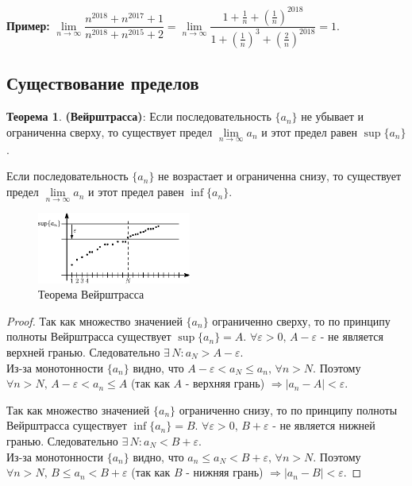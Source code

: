 \documentclass[12pt]{article}
\theoremstyle{definition}
\newtheorem{theorem}{Теорема}
\begin{document}
\textbf{Пример:} $\lim\limits_{n \to \infty}\dfrac{n^{2018} + n^{2017} + 1}{n^{2018} + n^{2015} + 2} = \lim\limits_{n \to \infty}\dfrac{1 + \frac{1}{n} + (\frac{1}{n})^{2018}}{1 + (\frac{1}{n})^3 + (\frac{2}{n})^{2018}} = 1$.


\subsection*{Существование пределов}

\begin{theorem}\textbf{(Вейрштрасса)}:
	Если последовательность $\{a_n\}$ не убывает и ограниченна сверху, то существует предел  $\lim\limits_{n \rightarrow \infty}{a_n}$ и этот предел равен $\sup\{a_n\}$.
	
	Если последовательность $\{a_n\}$ не возрастает и ограниченна снизу, то существует предел  $\lim\limits_{n \rightarrow \infty}{a_n}$ и этот предел равен $\inf \{a_n\}$.
\end{theorem}


\begin{figure}[H]
	\centering
	\includegraphics[width=0.45\textwidth]{8_10.eps}
	\caption{Теорема Вейрштрасса}
	\label{fig:8_12}
\end{figure}

\begin{proof}
Так как множество значенией $\{a_n\}$ ограниченно сверху, то по принципу полноты Вейрштрасса существует $\sup\{a_n\} = A$. $\forall \varepsilon > 0, \, A - \varepsilon$ - не является верхней гранью. Следовательно $\exists \, N\colon a_N > A - \varepsilon$.\\
Из-за монотонности $\{a_n\}$ видно, что $A - \varepsilon < a_N \leq a_n, \, \forall n > N$. Поэтому $\forall n > N, \, A - \varepsilon < a_n \leq A$ (так как $A$ - верхняя грань) $\Rightarrow |a_n - A| < \varepsilon$.
	
Так как множество значенией $\{a_n\}$ ограниченно снизу, то по принципу полноты Вейрштрасса существует $\inf\{a_n\} = B$. $\forall \varepsilon > 0, \, B + \varepsilon$ - не является нижней гранью. Следовательно $\exists \, N\colon a_N < B + \varepsilon$.\\
Из-за монотонности $\{a_n\}$ видно, что $a_n \leq a_N < B + \varepsilon, \, \forall n > N$. Поэтому $\forall n > N, \, B \leq a_n < B + \varepsilon$ (так как $B$ - нижняя грань) $\Rightarrow |a_n - B| < \varepsilon$.
\end{proof}
\end{document}
